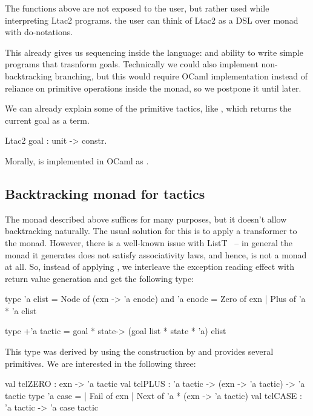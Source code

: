 The functions above are not exposed to the user, but rather used while interpreting Ltac2 programs.
the user can think of Ltac2 as a DSL over  monad with do-notations.

This already gives us sequencing inside the language:  and ability to write simple programs that trasnform goals.
Technically we could also implement non-backtracking branching, but this would require OCaml implementation instead of reliance on primitive operations inside the monad, so we postpone it until later.

We can already explain some of the primitive tactics, like , which returns the current goal as a term.
\begin{coq}
  Ltac2 goal : unit -> constr.
\end{coq}\vspace{-1em}
Morally,  is implemented in OCaml as .

\subsection{Backtracking monad for tactics}
\label{sec:backtr-monad-tact}

The monad described above suffices for many purposes, but it doesn't allow backtracking naturally.
The usual solution for this is to apply a  transformer to the monad.
However, there is a well-known issue with ListT~\cite{jones1993composing} -- in general the monad it generates does not satisfy associativity laws, and hence, is not a monad at all.
So, instead of applying , we interleave the exception reading effect with return value generation and get the following type:
\begin{ocaml}
type 'a elist = Node of (exn -> 'a enode)
and 'a enode = Zero of exn | Plus of 'a * 'a elist

type +'a tactic = goal * state-> (goal list * state * 'a) elist
\end{ocaml}
This type was derived by \citet{spiwackAbstractTypeConstructing2010} using the construction by \citet{kiselyovBacktrackingInterleavingTerminating2005} and provides several primitives.
We are interested in the following three:
\begin{ocaml}
val tclZERO : exn -> 'a tactic
val tclPLUS : 'a tactic -> (exn -> 'a tactic) -> 'a tactic
type 'a case =
  | Fail of exn
  | Next of 'a * (exn -> 'a tactic)
val tclCASE : 'a tactic -> 'a case tactic
\end{ocaml}

